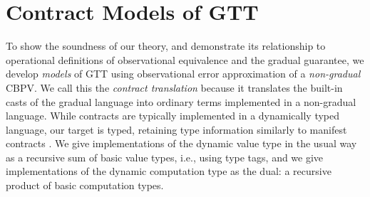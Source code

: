 \documentclass[acmsmall,screen,12pt]{acmart}
\newcommand{\ltdyn}{\sqsubseteq}
\newcommand{\gtdyn}{\sqsupseteq}
\begin{document}



\section{Contract Models of GTT}
\label{sec:contract}

To show the soundness of our theory, and demonstrate its relationship to
operational definitions of observational equivalence and the gradual
guarantee, we develop \emph{models} of GTT using observational error
approximation of a \emph{non-gradual} CBPV.
%
We call this the \emph{contract translation} because it translates the
built-in casts of the gradual language into ordinary terms implemented
in a non-gradual language.
%
While contracts are typically implemented in a dynamically typed
language, our target is typed, retaining type information similarly to
manifest contracts \cite{greenberg-manifest}.
%
We give implementations of the dynamic value type in the usual way as
a recursive sum of basic value types, i.e., using type tags, and we
give implementations of the dynamic computation type as the dual: a
recursive product of basic computation types.
\end{document}
